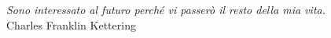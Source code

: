\begin{titlepage}
\nonumber
\null {}
	\begin{flushright}
\textit{Sono interessato al futuro perché vi passerò il resto della mia vita.} \\[5mm]

    Charles Franklin Kettering
	\end{flushright}
\end{titlepage}